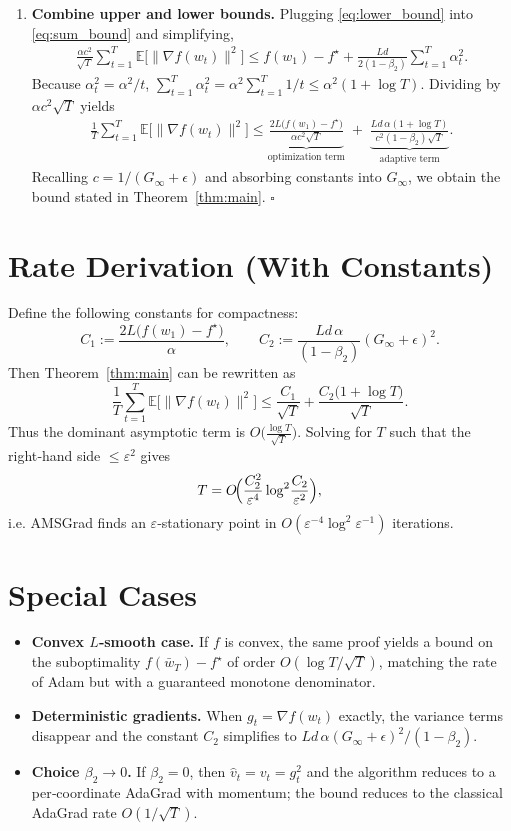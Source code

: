 \documentclass{article}
\begin{document}
\begin{enumerate}
\item[Step 8.] \textbf{Combine upper and lower bounds.} Plugging \eqref{eq:lower_bound} into \eqref{eq:sum_bound} and simplifying,
\begin{align}
\frac{\alpha c^{2}}{\sqrt{T}}\sum_{t=1}^{T}\mathbb{E}\bigl[\|\nabla f(w_t)\|^{2}\bigr]
\le f(w_1)-f^\star
     +\frac{L d}{2(1-\beta_2)}\sum_{t=1}^{T}\alpha_t^{2}.
\end{align}
Because $\alpha_t^{2}= \alpha^{2}/t$, $\sum_{t=1}^{T}\alpha_t^{2}= \alpha^{2}\sum_{t=1}^{T}1/t\le \alpha^{2}(1+\log T)$. Dividing by $\alpha c^{2}\sqrt{T}$ yields
\begin{align}
\frac{1}{T}\sum_{t=1}^{T}\mathbb{E}\bigl[\|\nabla f(w_t)\|^{2}\bigr]
\le
\underbrace{\frac{2L\bigl(f(w_1)-f^\star\bigr)}{\alpha c^{2}\sqrt{T}}}_{\text{optimization term}}
\;+\;
\underbrace{\frac{L d\,\alpha (1+\log T)}{c^{2}(1-\beta_2)\sqrt{T}}}_{\text{adaptive term}} .
\end{align}
Recalling $c=1/(G_\infty+\epsilon)$ and absorbing constants into $G_\infty$, we obtain the bound stated in Theorem~\ref{thm:main}. $\square$

\end{enumerate}

\section*{Rate Derivation (With Constants)}
Define the following constants for compactness:
\[
C_1 := \frac{2L\bigl(f(w_1)-f^\star\bigr)}{\alpha},\qquad
C_2 := \frac{L d\,\alpha}{(1-\beta_2)}(G_\infty+\epsilon)^{2}.
\]
Then Theorem~\ref{thm:main} can be rewritten as
\[
\frac{1}{T}\sum_{t=1}^{T}\mathbb{E}\bigl[\|\nabla f(w_t)\|^{2}\bigr]
\le \frac{C_1}{\sqrt{T}}+\frac{C_2\bigl(1+\log T\bigr)}{\sqrt{T}} .
\]
Thus the dominant asymptotic term is $O\!\bigl(\frac{\log T}{\sqrt{T}}\bigr)$. Solving for $T$ such that the right‑hand side $\le\varepsilon^{2}$ gives
\[
T = O\!\Bigl(\frac{C_2^{2}}{\varepsilon^{4}}\log^{2}\!\frac{C_2}{\varepsilon^{2}}\Bigr),
\]
i.e. AMSGrad finds an $\varepsilon$‑stationary point in $O(\varepsilon^{-4}\log^{2}\varepsilon^{-1})$ iterations.

\section*{Special Cases}
\begin{itemize}[leftmargin=*]
\item \textbf{Convex $L$‑smooth case.} If $f$ is convex, the same proof yields a bound on the suboptimality $f(\bar w_T)-f^\star$ of order $O(\log T/\sqrt{T})$, matching the rate of Adam but with a guaranteed monotone denominator.
\item \textbf{Deterministic gradients.} When $g_t=\nabla f(w_t)$ exactly, the variance terms disappear and the constant $C_2$ simplifies to $L d\,\alpha (G_\infty+\epsilon)^{2}/(1-\beta_2)$.
\item \textbf{Choice $\beta_2\to 0$.} If $\beta_2=0$, then $\hat v_t = v_t = g_t^{2}$ and the algorithm reduces to a per‑coordinate AdaGrad with momentum; the bound reduces to the classical AdaGrad rate $O(1/\sqrt{T})$.
\end{itemize}
\end{document}
